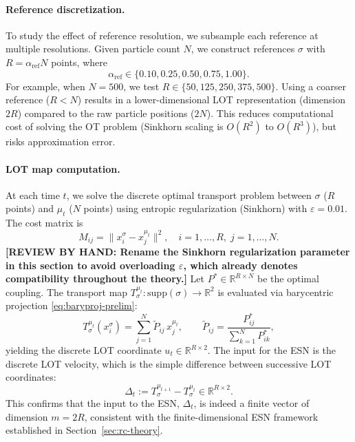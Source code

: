 \documentclass[11pt]{article}
\newcommand{\review}[1]{{\color{red}\textbf{[REVIEW BY HAND: #1]}}}
\newcommand{\R}{\mathbb{R}}
\newcommand{\1}{\mathbf{1}}
\begin{document}
\paragraph{Reference discretization.}
To study the effect of reference resolution, we subsample each reference at multiple resolutions. Given particle count $N$, we construct references $\sigma$ with $R = \alpha_{\text{ref}} N$ points, where
\[
\alpha_{\text{ref}} \in \{0.10, 0.25, 0.50, 0.75, 1.00\}.
\]
For example, when $N = 500$, we test $R \in \{50, 125, 250, 375, 500\}$. Using a coarser reference ($R <N$) results in a lower-dimensional LOT representation (dimension $2R$) compared to the raw particle positions ($2N$). This reduces computational cost of solving the OT problem (Sinkhorn scaling is $O(R^2)$ to $O(R^3)$), but risks approximation error.

\paragraph{LOT map computation.} At each time $t$, we solve the discrete optimal transport problem between $\sigma$ ($R$ points) and $\mu_t$ ($N$ points) using entropic regularization (Sinkhorn) with $\varepsilon = 0.01$. The cost matrix is
\begin{equation}
M_{ij} = \|x_i^\sigma - x_j^{\mu_t}\|^2, \quad i = 1,\dots,R,\; j = 1,\dots,N.
\end{equation}
\review{Rename the Sinkhorn regularization parameter in this section to avoid overloading $\varepsilon$, which already denotes compatibility throughout the theory.}
Let $P^* \in \R^{R\times N}$ be the optimal coupling. The transport map $T_\sigma^{\mu_t}:\mathrm{supp}(\sigma)\to\R^2$ is evaluated via barycentric projection \eqref{eq:baryproj-prelim}:
\begin{equation}\label{eq:bary-impl}
T_\sigma^{\mu_t}(x_i^\sigma) 
= \sum_{j=1}^N \widetilde{P}_{ij}\, x_j^{\mu_t}, 
\qquad 
\widetilde{P}_{ij} = \frac{P^*_{ij}}{\sum_{k=1}^N P^*_{ik}},
\end{equation}
yielding the discrete LOT coordinate $u_t \in \R^{R \times 2}$. The input for the ESN is the discrete LOT velocity, which is the simple difference between successive LOT coordinates:
\begin{equation}\label{eq:lot-vel-discrete}
\Delta_t := T_\sigma^{\mu_{t+1}} - T_\sigma^{\mu_t} \in \R^{R \times 2}.
\end{equation}
This confirms that the input to the ESN, $\Delta_t$, is indeed a finite vector of dimension $m=2R$, consistent with the finite-dimensional ESN framework established in Section~\ref{sec:rc-theory}.
\end{document}
